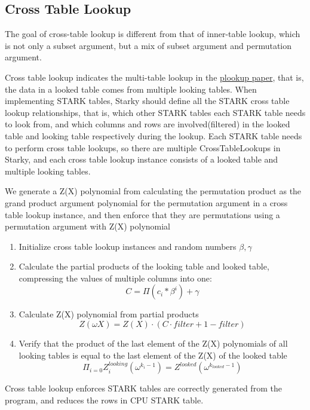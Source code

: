 \subsection{Cross Table Lookup}\label{section: cross-table-lookup}

The goal of cross-table lookup is different from that of inner-table lookup, which is not only a subset argument, but a mix of subset argument and permutation argument.

Cross table lookup indicates the multi-table lookup in the \href{https://eprint.iacr.org/2020/315.pdf}{plookup paper}, that is, the data in a looked table comes from multiple looking tables. When implementing STARK tables, Starky should define all the STARK cross table lookup relationships, that is, which other STARK tables each STARK table needs to look from, and which columns and rows are involved(filtered) in the looked table and looking table respectively during the lookup. Each STARK table needs to perform cross table lookups, so there are multiple CrossTableLookups in Starky, and each cross table lookup instance consists of a looked table and multiple looking tables.

We generate a Z(X) polynomial from calculating the permutation product as the grand product argument polynomial for the permutation argument in a cross table lookup instance, and then enforce that they are permutations using a permutation argument with Z(X) polynomial

\begin{enumerate}
    \item Initialize cross table lookup instances and random numbers $\beta, \gamma$
    \item Calculate the partial products of the looking table and looked table, compressing the values of multiple columns into one:$$C = \Pi(c_i * \beta^i) + \gamma$$
    \item Calculate Z(X) polynomial from partial products $$Z(\omega X) = Z(X)\cdot (C \cdot filter + 1 - filter)$$
    \item Verify that the product of the last element of the Z(X) polynomials of all looking tables is equal to the last element of the Z(X) of the looked table
    $$\Pi_{i=0} Z^{looking}_{i}(\omega^{k_i-1}) = Z^{looked}(\omega^{k_{looked}-1})$$
\end{enumerate}

Cross table lookup enforces STARK tables are correctly generated from the program, and reduces the rows in CPU STARK table.
